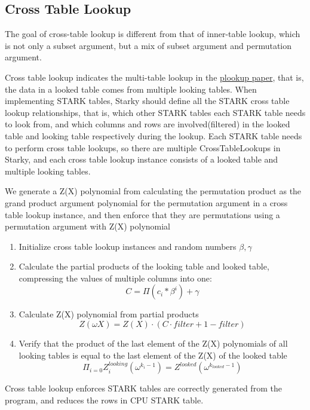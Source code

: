 \subsection{Cross Table Lookup}\label{section: cross-table-lookup}

The goal of cross-table lookup is different from that of inner-table lookup, which is not only a subset argument, but a mix of subset argument and permutation argument.

Cross table lookup indicates the multi-table lookup in the \href{https://eprint.iacr.org/2020/315.pdf}{plookup paper}, that is, the data in a looked table comes from multiple looking tables. When implementing STARK tables, Starky should define all the STARK cross table lookup relationships, that is, which other STARK tables each STARK table needs to look from, and which columns and rows are involved(filtered) in the looked table and looking table respectively during the lookup. Each STARK table needs to perform cross table lookups, so there are multiple CrossTableLookups in Starky, and each cross table lookup instance consists of a looked table and multiple looking tables.

We generate a Z(X) polynomial from calculating the permutation product as the grand product argument polynomial for the permutation argument in a cross table lookup instance, and then enforce that they are permutations using a permutation argument with Z(X) polynomial

\begin{enumerate}
    \item Initialize cross table lookup instances and random numbers $\beta, \gamma$
    \item Calculate the partial products of the looking table and looked table, compressing the values of multiple columns into one:$$C = \Pi(c_i * \beta^i) + \gamma$$
    \item Calculate Z(X) polynomial from partial products $$Z(\omega X) = Z(X)\cdot (C \cdot filter + 1 - filter)$$
    \item Verify that the product of the last element of the Z(X) polynomials of all looking tables is equal to the last element of the Z(X) of the looked table
    $$\Pi_{i=0} Z^{looking}_{i}(\omega^{k_i-1}) = Z^{looked}(\omega^{k_{looked}-1})$$
\end{enumerate}

Cross table lookup enforces STARK tables are correctly generated from the program, and reduces the rows in CPU STARK table.
